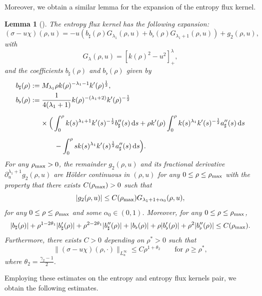 \documentclass[reqno,11pt]{amsart}
\numberwithin{equation}{section}
\newtheorem{lemma}[theorem]{Lemma}
\theoremstyle{definition}
\def\dd{{\, \rm d}}
\begin{document}
Moreover, we obtain a similar lemma for the expansion of the entropy flux kernel.
\begin{lemma}[]
 The entropy flux kernel has the following expansion{\rm:}
 \[
  (\sigma - u\chi)(\rho,u) = - u (b_\sharp(\rho) G_{\lambda_1}(\rho,u) + b_\flat(\rho) G_{\lambda_1 + 1}(\rho,u)) + g_2(\rho,u),
 \]
 with
 \[
  G_{\lambda}(\rho,u) = [k(\rho)^2 - u^2]^\lambda_+,
 \]
 and the coefficients $b_\sharp(\rho)$ and $b_\flat(\rho)$ given by
  \begin{align*}
  &b_\sharp(\rho):= M_{\lambda_1} \rho k(\rho)^{-\lambda_1 - 1} k'(\rho)^{\frac{1}{2}}, \\
  &\displaystyle b_\flat(\rho):=\frac{1}{4(\lambda_1 + 1)} k(\rho)^{-(\lambda_1 + 2)} k'(\rho)^{-\frac{1}{2}} \\[2mm]
  &\qquad\quad \,\,\,\times\Big (\displaystyle  \int^\rho_0 k(s)^{\lambda_1 + 1} k'(s)^{-\frac{1}{2}} b_\sharp''(s) \dd s 
  + \rho k'(\rho) \int^\rho_0  k(s)^{\lambda_1} k'(s)^{-\frac{1}{2}} a_\sharp''(s) \dd s\\[2mm]
 &\qquad\qquad \quad\,\,\,\displaystyle  - \int^\rho_0 s k(s)^{\lambda_1} k'(s)^{\frac{1}{2}} a_\sharp''(s) \dd s \Big).
 \end{align*}
For any $\rho_\text{\rm max} > 0$, the remainder $g_2(\rho,u)$ and its fractional derivative $\partial^{\lambda_1 + 1}_u g_2(\rho,u)$ are H\"older continuous in $(\rho,u)$ for any 
 $0 \leq \rho \leq \rho_\text{\rm max}$ with the property that 
there exists $C(\rho_\text{\rm max}) > 0$ such that
 \[
  |g_2(\rho,u)| \leq C(\rho_\text{\rm max} )G_{\lambda_1 + 1 + \alpha_0}(\rho,u),
 \]
 for any $0 \leq \rho \leq \rho_\text{\rm max}$ and some $\alpha_0 \in (0,1)$. 
 Moreover, for any $0 \leq \rho \leq \rho_\text{\rm max}$,
 \[
|b_\sharp(\rho)| + \rho^{1-2\theta_1} |b_\sharp'(\rho)| + \rho^{2-2\theta_1} |b_\sharp''(\rho)| + |b_\flat(\rho)| + \rho |b_\flat'(\rho)| + \rho^2 |b_\flat''(\rho)| \leq C(\rho_\text{\rm max}).
  \]
  Furthermore, there exists $C > 0$ depending on $\rho^* > 0$ such that
 \[
  \|(\sigma - u\chi)(\rho,\cdot)\|_{L^\infty_u} \leq C\rho^{1+\theta_2}\qquad
 \mbox{for $\rho \geq \rho^*$},
  \]
 where $\theta_2=\frac{\gamma_2-1}{2}$.
 \end{lemma}

Employing these estimates on the entropy and entropy flux kernels pair, 
we obtain the following estimates.
\end{document}
